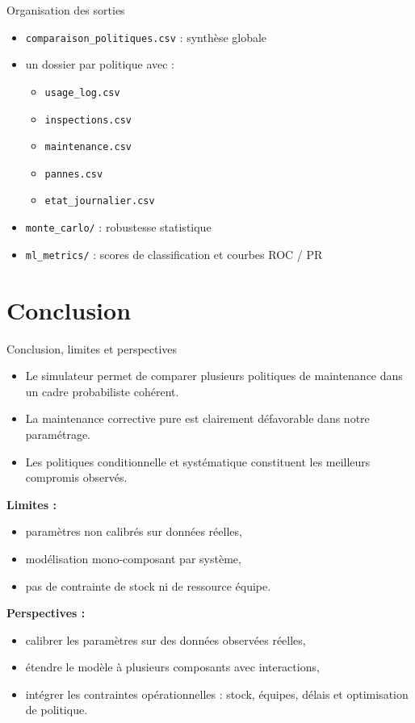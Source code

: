 \documentclass[aspectratio=169]{beamer}
\begin{document}
\begin{frame}{Organisation des sorties}
\begin{itemize}
  \item \texttt{comparaison\_politiques.csv} : synthèse globale
  \item un dossier par politique avec :
  \begin{itemize}
    \item \texttt{usage\_log.csv}
    \item \texttt{inspections.csv}
    \item \texttt{maintenance.csv}
    \item \texttt{pannes.csv}
    \item \texttt{etat\_journalier.csv}
  \end{itemize}
  \item \texttt{monte\_carlo/} : robustesse statistique
  \item \texttt{ml\_metrics/} : scores de classification et courbes ROC / PR
\end{itemize}
\end{frame}

\section{Conclusion}

\begin{frame}{Conclusion, limites et perspectives}
\begin{itemize}
  \item Le simulateur permet de comparer plusieurs politiques de maintenance dans un cadre probabiliste cohérent.
  \item La maintenance corrective pure est clairement défavorable dans notre paramétrage.
  \item Les politiques conditionnelle et systématique constituent les meilleurs compromis observés.
\end{itemize}

\vspace{0.3cm}
\textbf{Limites :}
\begin{itemize}
  \item paramètres non calibrés sur données réelles,
  \item modélisation mono-composant par système,
  \item pas de contrainte de stock ni de ressource équipe.
\end{itemize}

\textbf{Perspectives :}
\begin{itemize}
  \item calibrer les paramètres sur des données observées réelles,
  \item étendre le modèle à plusieurs composants avec interactions,
  \item intégrer les contraintes opérationnelles : stock, équipes, délais et optimisation de politique.
\end{itemize}
\end{frame}
\end{document}

